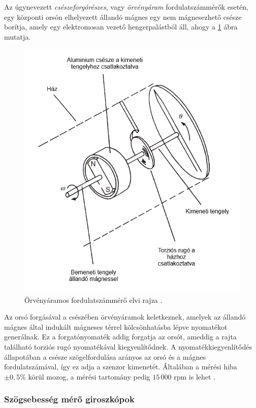 Az úgynevezett \textit{csészeforgórészes}, vagy \textit{örvényáram} fordulatszámmérők esetén, egy központi orsón elhelyezett állandó mágnes egy nem mágnesezhető csésze borítja, amely egy elektromosan vezető hengerpalástból áll, ahogy a \ref{dragcup} ábra mutatja.
\begin{figure}
	\centering
	\includegraphics[width=\columnwidth*6/10]{figures/dragcup.png}
	\caption{Örvényáramos fordulatszámmérő elvi rajza \cite{Morris2016b}.}
	\label{dragcup}
\end{figure}
Az orsó forgásával a csészében örvényáramok keletkeznek, amelyek az állandó mágnes által indukált mágneses térrel kölcsönhatásba lépve nyomatékot generálnak. Ez a forgatónyomaték addig forgatja az orsót, ameddig a rajta található torziós rugó nyomatékával kiegyenlítődnek. A nyomatékkiegyenlítődés állapotában a csésze szögelfordulása arányos az orsó és a mágnes fordulatszámával, így ez adja a szenzor kimenetét. Általában a mérési hiba $\pm 0,5\%$ körül mozog, a mérési tartomány pedig $15\,000$ rpm is lehet \cite{Morris2016b}.

\subsubsection{Szögsebesség mérő giroszkópok}

